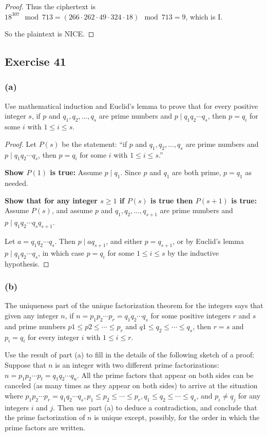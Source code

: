 \documentclass[14pt]{extarticle}
\begin{document}
\begin{proof}
        Thus the ciphertext is \(18^{307} \mod 713 = (266 \cdot 262 \cdot 49 \cdot 324 \cdot 18) \mod 713 = 9\), which is I.

        So the plaintext is NICE.
\end{proof}

\subsection{Exercise 41}
\subsubsection{(a)}
Use mathematical induction and Euclid’s lemma to prove that for every positive integer $s$, if $p$ and \(q_1, q_2,
\ldots, q_s\) are prime numbers and \(p \mid q_1q_2 \cdots q_s\), then \(p=q_i\) for some $i$ with \(1\leq i \leq s\).

\begin{proof}
        Let $P(s)$ be the statement: ``if $p$ and \(q_1, q_2, \ldots, q_s\) are prime numbers and \(p \mid q_1q_2 \cdots
        q_s\), then \(p=q_i\) for some $i$ with \(1\leq i \leq s\).''

        {\bf Show \(P(1)\) is true:} Assume \(p \mid q_1\). Since $p$ and $q_1$ are both prime, \(p = q_1\) as needed.

                {\bf Show that for any integer \(s \geq 1\) if \(P(s)\) is true then \(P(s+1)\) is true:} Assume \(P(s)\), and assume
        $p$ and \(q_1, q_2, \ldots, q_{s+1}\) are prime numbers and \(p \mid q_1q_2 \cdots q_s q_{s+1}\).

        Let \(a = q_1q_2 \cdots q_s\). Then \(p \mid a q_{s+1}\), and either \(p = q_{s+1}\), or by Euclid’s lemma
        \(p \mid q_1q_2 \cdots q_s\), in which case \(p = q_i\) for some \(1 \leq i \leq s\) by the inductive hypothesis.
\end{proof}

\subsubsection{(b)}
The uniqueness part of the unique factorization theorem for the integers says that given any integer $n$, if \(n = p_1
p_2 \cdots p_r = q_1q_2 \cdots q_s\) for some positive integers $r$ and $s$ and prime numbers \(p1 \leq p2 \leq
\cdots \leq p_r\) and \(q1 \leq q_2 \leq \cdots \leq q_s\), then \(r = s\) and \(p_i = q_i\) for every integer $i$ with
\(1 \leq i \leq r\).

Use the result of part (a) to fill in the details of the following sketch of a proof: Suppose that $n$ is an integer
with two different prime factorizations: \(n = p_1 p_2 \cdots p_t = q_1 q_2 \cdots q_u\). All the prime factors
that appear on both sides can be canceled (as many times as they appear on both sides) to arrive at the situation where
\(p_1 p_2 \cdots p_r = q_1 q_2 \cdots q_s, p_1 \leq p_2 \leq \cdots \leq p_r, q_1 \leq q_2 \leq \cdots \leq q_s\),
and \(p_i \neq q_j\) for any integers $i$ and $j$. Then use part (a) to deduce a contradiction, and conclude that the
prime factorization of $n$ is unique except, possibly, for the order in which the prime factors are written.
\end{document}
